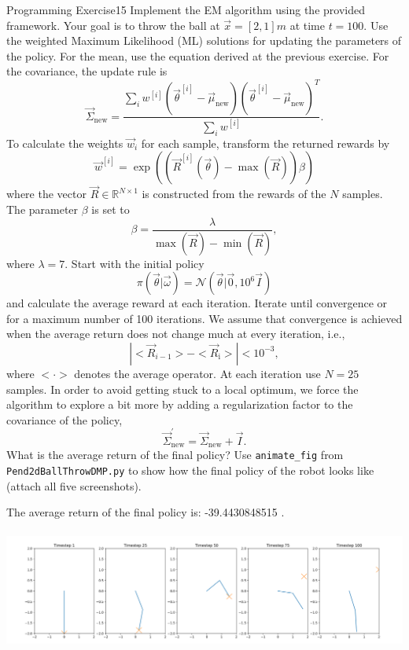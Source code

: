 \begin{questions}
\begin{question}{Programming Exercise}{15}
Implement the EM algorithm using the provided framework. Your goal is to throw the ball at $\vec x = [2,1]m$ at time $t=100$. Use the weighted Maximum Likelihood (ML) solutions for updating the parameters of the policy. For the mean, use the equation derived at the previous exercise. For the covariance, the update rule is 
\begin{equation}
	\vec \Sigma_\mathrm{new} = \frac{\sum_i w^{[i]} (\vec{\theta}^{[i]}-\vec{\mu}_{\mathrm{new}})     (\vec{\theta}^{[i]}-\vec{\mu}_{\mathrm{new}})^T}{\sum_i w^{[i]}}.
\end{equation}
To calculate the weights $\vec{w}_i$ for each sample, transform the returned rewards by 
\begin{equation}
	\vec w^{[i]} = \exp ( ( \vec{R}^{[i]}(\vec{\theta}) - \max(\vec{R}) ) \beta )
\end{equation}
where the vector $\vec R\in \mathbb{R}^{N \times 1}$ is constructed from the rewards of the $N$ samples. The
parameter $\beta$ is set to
\begin{equation}
	\beta = \frac{\lambda}{ \max(\vec{R}) - \min(\vec{R}) },
\end{equation}
where $\lambda = 7$. Start with the initial policy 
\begin{equation}
	\pi(\vec{\theta}|\vec{\omega}) = \mathcal{N}(\vec{\theta}|\vec{0}, 10^6  \vec{I})
\end{equation}
and calculate the average reward at each iteration. Iterate until convergence or for a maximum number of 100 iterations.
We assume that convergence is achieved when the average return does not change much at every iteration, i.e., 
$$ | <\vec{R}_{i-1}> - <\vec{R}_\textrm{i}> | < 10^{-3}, $$
where $<\cdot>$ denotes the average operator.
At each iteration use 
$ N = 25 $ samples. In order to avoid getting stuck to a local optimum, we force the algorithm to explore a bit more by adding a regularization factor to the covariance of the policy,
\begin{equation}
    \vec{\Sigma}_\mathrm{new}^\mathrm{'} = \vec{\Sigma}_\mathrm{new} + \vec{I}.
\end{equation}
What is the average return of the final policy? 
Use \texttt{animate\_fig} from \texttt{Pend2dBallThrowDMP.py} to show how the final policy of the robot looks like (attach all five screenshots).

\begin{answer}

	The average return of the final policy is: -39.4430848515 .\\
	\\
	\includegraphics[width=174mm]{EM-l7.png}
	


\end{answer}
\end{question}
\end{questions}
